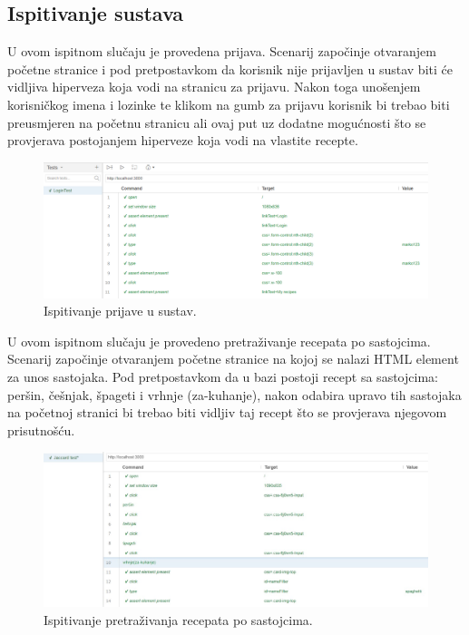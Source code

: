 \subsection{Ispitivanje sustava}
\noindent {}\break
U ovom ispitnom slučaju je provedena prijava. Scenarij započinje otvaranjem početne stranice i pod pretpostavkom da korisnik
nije prijavljen u sustav biti će vidljiva hiperveza koja vodi na stranicu za prijavu. Nakon toga unošenjem korisničkog imena
i lozinke te klikom na gumb za prijavu korisnik bi trebao biti preusmjeren na početnu stranicu ali ovaj put uz dodatne mogućnosti
što se provjerava postojanjem hiperveze koja vodi na vlastite recepte.
\begin{figure}[H]
	\includegraphics[scale=0.6]{slike/login.png} %
	\centering
	\caption{Ispitivanje prijave u sustav.}
	\label{fig:promjene}
\end{figure}

\noindent {}\break
U ovom ispitnom slučaju je provedeno pretraživanje recepata po sastojcima. Scenarij započinje
otvaranjem početne stranice na kojoj se nalazi HTML element za unos sastojaka. Pod pretpostavkom
da u bazi postoji recept sa sastojcima: peršin, češnjak, špageti i vrhnje (za-kuhanje),
nakon odabira upravo tih sastojaka na početnoj stranici bi trebao biti vidljiv taj recept što se
provjerava njegovom prisutnošću.
\begin{figure}[H]
	\includegraphics[scale=0.6]{slike/jaccard.jpg} %
	\centering
	\caption{Ispitivanje pretraživanja recepata po sastojcima.}
	\label{fig:promjene}
\end{figure}

